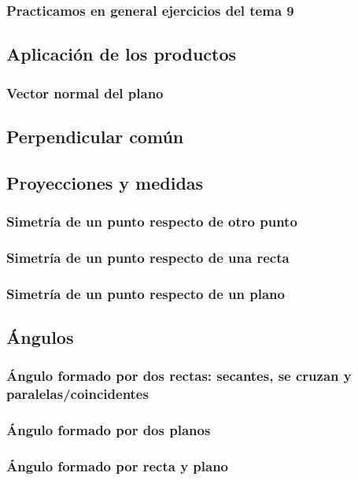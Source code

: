 \subsubsection{Practicamos en general ejercicios del tema 9}

\subsection{Aplicación de los productos}

\subsubsection{Vector normal del plano}
\subsection{Perpendicular común}

\subsection{Proyecciones y medidas}
\subsubsection{Simetría de un punto respecto de otro punto}
\subsubsection{Simetría de un punto respecto de una recta}
\subsubsection{Simetría de un punto respecto de un plano}

\newpage
\subsection{Ángulos}
\subsubsection{Ángulo formado por dos rectas: secantes, se cruzan y paralelas/coincidentes}
\subsubsection{Ángulo formado por dos planos}
\subsubsection{Ángulo formado por recta y plano}

